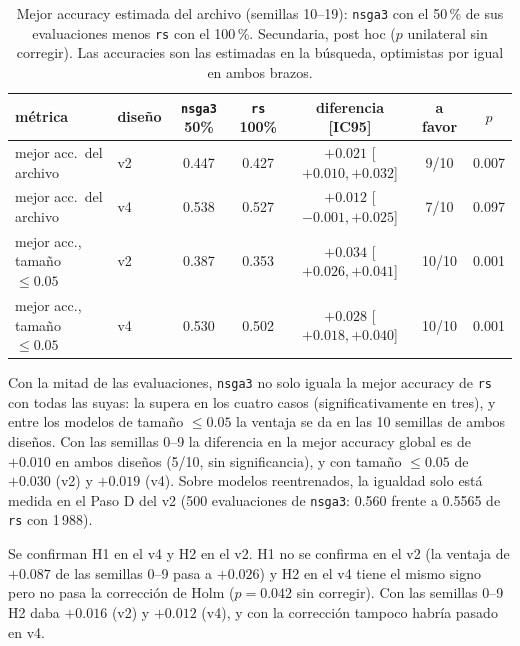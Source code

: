 \documentclass[11pt,a4paper]{article}
\begin{document}
\begin{table}[h]
\centering\small
\setlength{\tabcolsep}{4pt}
\begin{tabular}{llccccc}
\toprule
métrica & diseño & \texttt{nsga3} 50\% & \texttt{rs} 100\% & diferencia [IC95] & a favor & $p$\\
\midrule
mejor acc.\ del archivo & v2 & 0.447 & 0.427 & $+0.021$ [$+0.010,+0.032$] & 9/10 & 0.007\\
mejor acc.\ del archivo & v4 & 0.538 & 0.527 & $+0.012$ [$-0.001,+0.025$] & 7/10 & 0.097\\
mejor acc., tamaño $\le0.05$ & v2 & 0.387 & 0.353 & $+0.034$ [$+0.026,+0.041$] & 10/10 & 0.001\\
mejor acc., tamaño $\le0.05$ & v4 & 0.530 & 0.502 & $+0.028$ [$+0.018,+0.040$] & 10/10 & 0.001\\
\bottomrule
\end{tabular}
\caption{Mejor accuracy estimada del archivo (semillas 10--19): \texttt{nsga3} con el 50\,\% de sus evaluaciones menos \texttt{rs} con el 100\,\%. Secundaria, post hoc ($p$ unilateral sin corregir). Las accuracies son las estimadas en la búsqueda, optimistas por igual en ambos brazos.}
\label{tab:h2b}
\end{table}
Con la mitad de las evaluaciones, \texttt{nsga3} no solo iguala la mejor accuracy de \texttt{rs} con todas las suyas: la supera en los cuatro casos (significativamente en tres), y entre los modelos de tamaño $\le0.05$ la ventaja se da en las 10 semillas de ambos diseños. Con las semillas 0--9 la diferencia en la mejor accuracy global es de $+0.010$ en ambos diseños (5/10, sin significancia), y con tamaño $\le0.05$ de $+0.030$ (v2) y $+0.019$ (v4). Sobre modelos reentrenados, la igualdad solo está medida en el Paso D del v2 (500 evaluaciones de \texttt{nsga3}: 0.560 frente a 0.5565 de \texttt{rs} con 1\,988).

Se confirman H1 en el v4 y H2 en el v2. H1 no se confirma en el v2 (la ventaja de $+0.087$ de las semillas 0--9 pasa a $+0.026$) y H2 en el v4 tiene el mismo signo pero no pasa la corrección de Holm ($p=0.042$ sin corregir). Con las semillas 0--9 H2 daba $+0.016$ (v2) y $+0.012$ (v4), y con la corrección tampoco habría pasado en v4.
\end{document}
